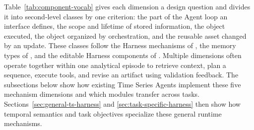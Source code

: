 \documentclass[preprints,article,submit,moreauthors]{Definitions/mdpi}
\begin{document}
Table~\ref{tab:component-vocab} gives each dimension a design question and divides it into second-level classes by one criterion: the part of the Agent loop an interface defines, the scope and lifetime of stored information, the object executed, the object organized by orchestration, and the reusable asset changed by an update. These classes follow the Harness mechanisms of \citet{ning2026codeharness}, the memory types of \citet{sumers2024coala}, and the editable Harness components of \citet{lin2026agenticharness}. Multiple dimensions often operate together within one analytical episode to retrieve context, plan a sequence, execute tools, and revise an artifact using validation feedback. The subsections below show how existing Time Series Agents implement these five mechanism dimensions and which modules transfer across tasks. Sections~\ref{sec:general-ts-harness} and \ref{sec:task-specific-harness} then show how temporal semantics and task objectives specialize these general runtime mechanisms.
\end{document}
